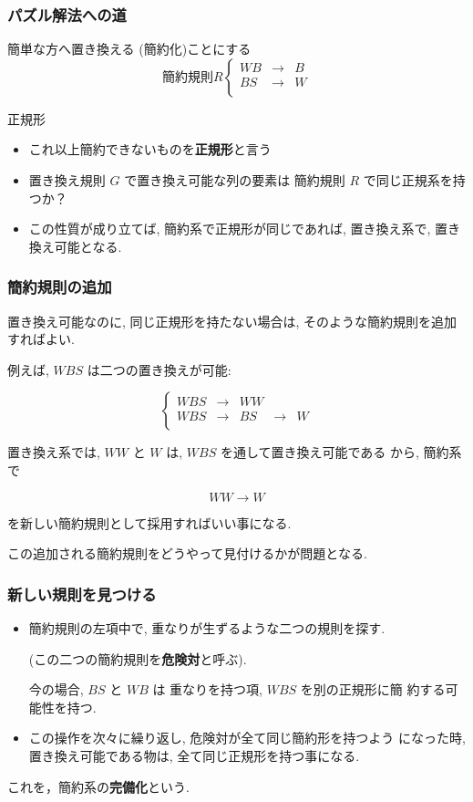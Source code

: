 \begin{frame}\frametitle{パズル解法への道}
\begin{block}{簡単な方へ置き換える (簡約化)ことにする}
\[
\mbox{簡約規則} R \left\{ \begin{array}{rll}
WB & \rightarrow  &  B\\
BS & \rightarrow   & W  \\
	  \end{array}
\right.
\]
\end{block}

\begin{block}{正規形}
\begin{itemize}
\item これ以上簡約できないものを{\bf 正規形}と言う

\item 置き換え規則 $G$ で置き換え可能な列の要素は
      簡約規則 $R$ で同じ正規系を持つか？

\item この性質が成り立てば, 簡約系で正規形が同じであれば, 
      置き換え系で, 置き換え可能となる.
\end{itemize}
\end{block}
\end{frame}

\begin{frame}\frametitle{簡約規則の追加}

置き換え可能なのに, 同じ正規形を持たない場合は,
そのような簡約規則を追加すればよい.

例えば, $WBS$ は二つの置き換えが可能:

\[
\left\{ \begin{array}{rllll}
WBS & \rightarrow  &  WW\\
WBS & \rightarrow   & BS & \rightarrow  & W\\
	  \end{array}
\right.
\]

置き換え系では, $WW$ と $W$ は, $WBS$ を通して置き換え可能である
から, 簡約系で

\[
WW  \rightarrow   W
\]

を新しい簡約規則として採用すればいい事になる.

この追加される簡約規則をどうやって見付けるかが問題となる.
\end{frame}

\begin{frame}\frametitle{新しい規則を見つける}
\begin{itemize}
\item 簡約規則の左項中で, 重なりが生ずるような二つの規則を探す.

(この二つの簡約規則を{\bf 危険対}と呼ぶ).

今の場合, $BS$ と $WB$ は 重なりを持つ項, $WBS$ を別の正規形に簡
約する可能性を持つ.

\item この操作を次々に繰り返し, 危険対が全て同じ簡約形を持つよう
になった時, 置き換え可能である物は, 全て同じ正規形を持つ事になる.
\end{itemize}

これを，簡約系の{\bf 完備化}という.
\end{frame}

